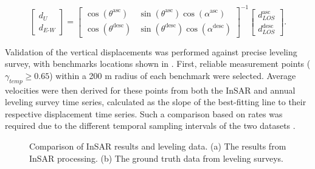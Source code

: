 \begin{equation}
	\begin{bmatrix}
		d_{\textit{U}} \\
		d_{\textit{E-W}}
	\end{bmatrix}
	=
	\begin{bmatrix}
		\cos(\theta^{\text{asc}}) & \sin(\theta^{\text{asc}}) \cos(\alpha^{\text{asc}}) \\
		\cos(\theta^{\text{desc}}) & \sin(\theta^{\text{desc}}) \cos(\alpha^{\text{desc}})
	\end{bmatrix}^{-1}
	\begin{bmatrix}
		d_{\textit{LOS}}^{\text{asc}} \\
		d_{\textit{LOS}}^{\text{desc}}
	\end{bmatrix}.
	\label{eq:decomposition} %
\end{equation}


Validation of the vertical displacements was performed against precise leveling survey, with benchmarks locations shown in . First, reliable measurement points ($\gamma_\textit{temp} \ge 0.65$) within a 200 m radius of each benchmark were selected. Average velocities were then derived for these points from both the InSAR and annual leveling survey time series, calculated as the slope of the best-fitting line to their respective displacement time series. Such a comparison based on rates was required due to the different temporal sampling intervals of the two datasets .

\begin{figure}[H]
	\centering
	
	\begin{subfigure}[b]{0.3\textwidth}
		\centering
		\framebox{\rule{0pt}{8cm}\rule{\textwidth}{0pt}}
		\caption{} %
		\label{fig:insar_leveling_a} %
	\end{subfigure}
	\quad
	\begin{subfigure}[b]{0.3\textwidth}
		\centering
		\framebox{\rule{0pt}{8cm}\rule{\textwidth}{0pt}}
		\caption{} %
		\label{fig:insar_leveling_b} %
	\end{subfigure}
	
	\caption{Comparison of InSAR results and leveling data. (a) The results from InSAR processing. (b) The ground truth data from leveling surveys.}
	\label{fig:insar_leveling} %
\end{figure}




